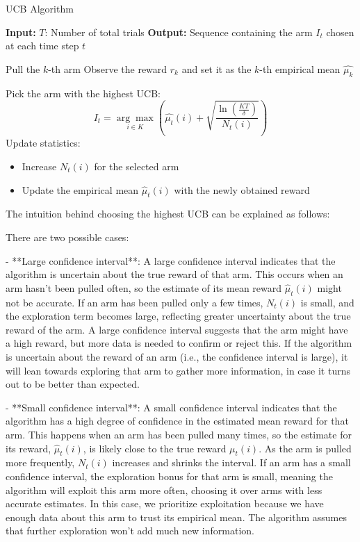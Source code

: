 \begin{algorithm}
    \caption{UCB Algorithm}
    \begin{algorithmic}[1]
        \State \textbf{Input:} $T$: Number of total trials
        \State \textbf{Output:} Sequence containing the arm $I_t$ chosen at each time step $t$

        \State Pull the $k$-th arm
        \State Observe the reward $r_k$ and set it as the $k$-th empirical mean $\hat{\mu_k}$
        \EndFor

        \State Pick the arm with the highest UCB:
        \[
            I_t = \underset{i \in K}{\arg\max} \left( \hat{\mu_t}(i) + \sqrt{\frac{\ln\left(\frac{KT}{\delta}\right)}{N_t(i)}} \right)
        \]
        \State Update statistics:
        \begin{itemize}
            \item Increase $N_t(i)$ for the selected arm
            \item Update the empirical mean $\hat{\mu}_t(i)$ with the newly obtained reward
        \end{itemize}
        \EndFor

    \end{algorithmic}
\end{algorithm}

The intuition behind choosing the highest UCB can be explained as follows:

There are two possible cases:

- **Large confidence interval**: A large confidence interval indicates that the algorithm is uncertain about the true reward of that arm. This occurs when an arm hasn’t been pulled often, so the estimate of its mean reward $\hat{\mu}_t(i)$ might not be accurate. If an arm has been pulled only a few times, $N_t(i)$ is small, and the exploration term becomes large, reflecting greater uncertainty about the true reward of the arm. A large confidence interval suggests that the arm might have a high reward, but more data is needed to confirm or reject this. If the algorithm is uncertain about the reward of an arm (i.e., the confidence interval is large), it will lean towards exploring that arm to gather more information, in case it turns out to be better than expected.

- **Small confidence interval**: A small confidence interval indicates that the algorithm has a high degree of confidence in the estimated mean reward for that arm. This happens when an arm has been pulled many times, so the estimate for its reward, $\hat{\mu}_t(i)$, is likely close to the true reward $\mu_t(i)$. As the arm is pulled more frequently, $N_t(i)$ increases and shrinks the interval. If an arm has a small confidence interval, the exploration bonus for that arm is small, meaning the algorithm will exploit this arm more often, choosing it over arms with less accurate estimates. In this case, we prioritize exploitation because we have enough data about this arm to trust its empirical mean. The algorithm assumes that further exploration won’t add much new information.

